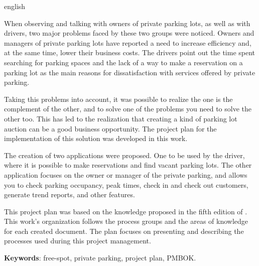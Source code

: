 \begin{resumo}[Abstract]
 \begin{otherlanguage*}{english}
   
   When observing and talking with owners of private parking lots, as well as with drivers, two major problems faced by these two groups were noticed. Owners and managers of private parking lots have reported a need to increase efficiency and, at the same time, lower their business costs. The drivers point out the time spent searching for parking spaces and the lack of a way to make a reservation on a parking lot as the main reasons for dissatisfaction with services offered by private parking.

   Taking this problems into account, it was possible to realize the one is the complement of the other, and to solve one of the problems you need to solve the other too. This has led to the realization that creating a kind of parking lot auction can be a good business opportunity. The project plan for the implementation of this solution was developed in this work.

   The creation of two applications were proposed. One to be used by the driver, where it is possible to make reservations and find vacant parking lots. The other application focuses on the owner or manager of the private parking, and allows you to check parking occupancy, peak times, check in and check out customers, generate trend reports, and other features.

   This project plan was based on the knowledge proposed in the fifth edition of \cite{project2013guia}. This work's organization follows the process groups and the areas of knowledge for each created document. The plan focuses on presenting and describing the processes used during this project management.

   \vspace{\onelineskip}
 
   \noindent 
   \textbf{Keywords}: free-spot, private parking, project plan, PMBOK.
 \end{otherlanguage*}
\end{resumo}